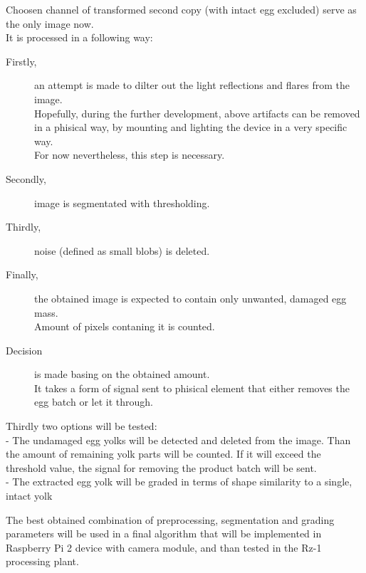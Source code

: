 \documentclass[12pt,twoside,a4paper]{article}
\begin{document}
Choosen channel of transformed second copy (with intact egg excluded) serve as the only image now.\\
It is processed in a following way:

\begin{description}
  \item[Firstly,]an attempt is made to dilter out the light reflections and flares from the image.\\
  Hopefully, during the further development, above artifacts can be removed in a phisical way, by mounting and lighting the device in a very specific way.\\
  For now nevertheless, this step is necessary.\\
  \item[Secondly,]image is segmentated with thresholding.
  \item[Thirdly,]noise (defined as small blobs) is deleted.
  \item[Finally,]the obtained image is expected to contain only unwanted, damaged egg mass.\\
  Amount of pixels contaning it is counted.
  \item[Decision] is made basing on the obtained amount.\\
  It takes a form of signal sent to phisical element that either removes the egg batch or let it through.
\end{description}


Thirdly two options will be tested:\\
- The undamaged egg yolks will be detected and deleted from the image. Than the amount of remaining yolk parts will be counted. If it will exceed the threshold value, the signal for removing the product batch will be sent.\\
- The extracted egg yolk will be graded in terms of shape similarity to a single, intact yolk

The best obtained combination of preprocessing, segmentation and grading parameters will be used in a final algorithm that will be implemented in Raspberry Pi 2 device with camera module, and than tested in the Rz-1 processing plant.
\end{document}
